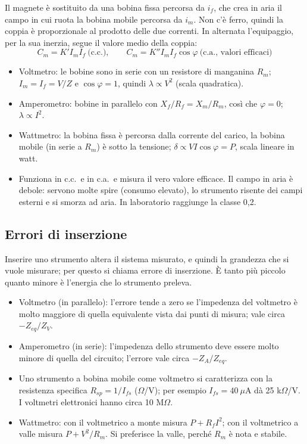 \documentclass[11pt,a4paper]{article}
\begin{document}
Il magnete è sostituito da una bobina fissa percorsa da $i_f$, che crea in aria il campo in cui ruota la bobina mobile percorsa da $i_m$. Non c'è ferro, quindi la coppia è proporzionale al prodotto delle due correnti. In alternata l'equipaggio, per la sua inerzia, segue il valore medio della coppia:
\[
C_m = K' I_m I_f \ \text{(c.c.)}, \qquad C_m = K'' I_m I_f \cos\varphi \ \text{(c.a., valori efficaci)}
\]
\begin{itemize}
\item Voltmetro: le bobine sono in serie con un resistore di manganina $R_m$; $I_m = I_f = V/Z$ e $\cos\varphi = 1$, quindi $\lambda \propto V^2$ (scala quadratica).
\item Amperometro: bobine in parallelo con $X_f/R_f = X_m/R_m$, così che $\varphi = 0$; $\lambda \propto I^2$.
\item Wattmetro: la bobina fissa è percorsa dalla corrente del carico, la bobina mobile (in serie a $R_m$) è sotto la tensione; $\delta \propto V I \cos\varphi = P$, scala lineare in watt.
\item Funziona in c.c.\ e in c.a.\ e misura il vero valore efficace. Il campo in aria è debole: servono molte spire (consumo elevato), lo strumento risente dei campi esterni e si smorza ad aria. In laboratorio raggiunge la classe 0,2.
\end{itemize}

\subsection*{Errori di inserzione}

Inserire uno strumento altera il sistema misurato, e quindi la grandezza che si vuole misurare; per questo si chiama errore di inserzione. È tanto più piccolo quanto minore è l'energia che lo strumento preleva.
\begin{itemize}
\item Voltmetro (in parallelo): l'errore tende a zero se l'impedenza del voltmetro è molto maggiore di quella equivalente vista dai punti di misura; vale circa $-Z_{eq}/Z_V$.
\item Amperometro (in serie): l'impedenza dello strumento deve essere molto minore di quella del circuito; l'errore vale circa $-Z_A/Z_{eq}$.
\item Uno strumento a bobina mobile come voltmetro si caratterizza con la resistenza specifica $R_{sp} = 1/I_{fs}$ ($\Omega$/V); per esempio $I_{fs} = 40\ \mu$A dà 25 k$\Omega$/V. I voltmetri elettronici hanno circa 10 M$\Omega$.
\item Wattmetro: con il voltmetrico a monte misura $P + R_f I^2$; con il voltmetrico a valle misura $P + V^2/R_m$. Si preferisce la valle, perché $R_m$ è nota e stabile.
\end{itemize}
\end{document}
